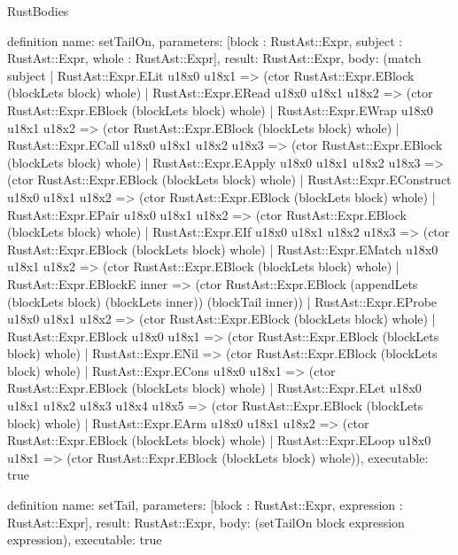 \begin{lexlean}{RustBodies}
\begin{semanticmodule}
definition{
  name: setTailOn,
  parameters: [block : RustAst::Expr, subject : RustAst::Expr, whole : RustAst::Expr],
  result: RustAst::Expr,
  body: (match subject
    | RustAst::Expr.ELit u18x0 u18x1 => (ctor RustAst::Expr.EBlock (blockLets block) whole)
    | RustAst::Expr.ERead u18x0 u18x1 u18x2 => (ctor RustAst::Expr.EBlock (blockLets block) whole)
    | RustAst::Expr.EWrap u18x0 u18x1 u18x2 => (ctor RustAst::Expr.EBlock (blockLets block) whole)
    | RustAst::Expr.ECall u18x0 u18x1 u18x2 u18x3 => (ctor RustAst::Expr.EBlock (blockLets block) whole)
    | RustAst::Expr.EApply u18x0 u18x1 u18x2 u18x3 => (ctor RustAst::Expr.EBlock (blockLets block) whole)
    | RustAst::Expr.EConstruct u18x0 u18x1 u18x2 => (ctor RustAst::Expr.EBlock (blockLets block) whole)
    | RustAst::Expr.EPair u18x0 u18x1 u18x2 => (ctor RustAst::Expr.EBlock (blockLets block) whole)
    | RustAst::Expr.EIf u18x0 u18x1 u18x2 u18x3 => (ctor RustAst::Expr.EBlock (blockLets block) whole)
    | RustAst::Expr.EMatch u18x0 u18x1 u18x2 => (ctor RustAst::Expr.EBlock (blockLets block) whole)
    | RustAst::Expr.EBlockE inner => (ctor RustAst::Expr.EBlock (appendLets (blockLets block) (blockLets inner)) (blockTail inner))
    | RustAst::Expr.EProbe u18x0 u18x1 u18x2 => (ctor RustAst::Expr.EBlock (blockLets block) whole)
    | RustAst::Expr.EBlock u18x0 u18x1 => (ctor RustAst::Expr.EBlock (blockLets block) whole)
    | RustAst::Expr.ENil => (ctor RustAst::Expr.EBlock (blockLets block) whole)
    | RustAst::Expr.ECons u18x0 u18x1 => (ctor RustAst::Expr.EBlock (blockLets block) whole)
    | RustAst::Expr.ELet u18x0 u18x1 u18x2 u18x3 u18x4 u18x5 => (ctor RustAst::Expr.EBlock (blockLets block) whole)
    | RustAst::Expr.EArm u18x0 u18x1 u18x2 => (ctor RustAst::Expr.EBlock (blockLets block) whole)
    | RustAst::Expr.ELoop u18x0 u18x1 => (ctor RustAst::Expr.EBlock (blockLets block) whole)),
  executable: true
}

definition{
  name: setTail,
  parameters: [block : RustAst::Expr, expression : RustAst::Expr],
  result: RustAst::Expr,
  body: (setTailOn block expression expression),
  executable: true
}


\end{semanticmodule}
\end{lexlean}
